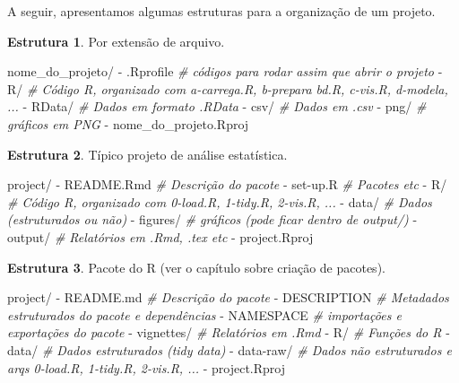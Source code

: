 \documentclass[]{book}
\newenvironment{Shaded}{\begin{snugshade}}{\end{snugshade}}
\newcommand{\CommentTok}[1]{\textcolor[rgb]{0.56,0.35,0.01}{\textit{#1}}}
\newcommand{\ExtensionTok}[1]{#1}
\newcommand{\NormalTok}[1]{#1}
\begin{document}
A seguir, apresentamos algumas estruturas para a organização de um projeto.

\textbf{Estrutura 1}. Por extensão de arquivo.

\begin{Shaded}
\begin{Highlighting}[]
\ExtensionTok{nome_do_projeto/}
  \ExtensionTok{-}\NormalTok{ .Rprofile   }\CommentTok{# códigos para rodar assim que abrir o projeto}
  \ExtensionTok{-}\NormalTok{ R/          }\CommentTok{# Código R, organizado com a-carrega.R, b-prepara bd.R, c-vis.R, d-modela, ...}
  \ExtensionTok{-}\NormalTok{ RData/      }\CommentTok{# Dados em formato .RData}
  \ExtensionTok{-}\NormalTok{ csv/        }\CommentTok{# Dados em .csv}
  \ExtensionTok{-}\NormalTok{ png/        }\CommentTok{# gráficos em PNG}
  \ExtensionTok{-}\NormalTok{ nome_do_projeto.Rproj}
\end{Highlighting}
\end{Shaded}

\textbf{Estrutura 2}. Típico projeto de análise estatística.

\begin{Shaded}
\begin{Highlighting}[]
\ExtensionTok{project/}
  \ExtensionTok{-}\NormalTok{ README.Rmd   }\CommentTok{# Descrição do pacote}
  \ExtensionTok{-}\NormalTok{ set-up.R     }\CommentTok{# Pacotes etc}
  \ExtensionTok{-}\NormalTok{ R/           }\CommentTok{# Código R, organizado com 0-load.R, 1-tidy.R, 2-vis.R, ...}
  \ExtensionTok{-}\NormalTok{ data/        }\CommentTok{# Dados (estruturados ou não)}
  \ExtensionTok{-}\NormalTok{ figures/     }\CommentTok{# gráficos (pode ficar dentro de output/)}
  \ExtensionTok{-}\NormalTok{ output/      }\CommentTok{# Relatórios em .Rmd, .tex etc}
  \ExtensionTok{-}\NormalTok{ project.Rproj}
\end{Highlighting}
\end{Shaded}

\textbf{Estrutura 3}. Pacote do R (ver o capítulo sobre criação de pacotes).

\begin{Shaded}
\begin{Highlighting}[]
\ExtensionTok{project/}
  \ExtensionTok{-}\NormalTok{ README.md    }\CommentTok{# Descrição do pacote}
  \ExtensionTok{-}\NormalTok{ DESCRIPTION  }\CommentTok{# Metadados estruturados do pacote e dependências}
  \ExtensionTok{-}\NormalTok{ NAMESPACE    }\CommentTok{# importações e exportações do pacote}
  \ExtensionTok{-}\NormalTok{ vignettes/   }\CommentTok{# Relatórios em .Rmd}
  \ExtensionTok{-}\NormalTok{ R/           }\CommentTok{# Funções do R}
  \ExtensionTok{-}\NormalTok{ data/        }\CommentTok{# Dados estruturados (tidy data)}
  \ExtensionTok{-}\NormalTok{ data-raw/    }\CommentTok{# Dados não estruturados e arqs 0-load.R, 1-tidy.R, 2-vis.R, ...}
  \ExtensionTok{-}\NormalTok{ project.Rproj}
\end{Highlighting}
\end{Shaded}
\end{document}
